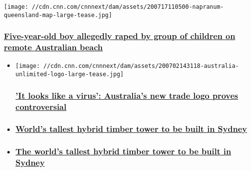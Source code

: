 \href{/2020/07/17/australia/australia-queensland-rape-boy-intl-hnk/index.html}{}

\texttt{[image: //cdn.cnn.com/cnnnext/dam/assets/200717110500-napranum-queensland-map-large-tease.jpg]}

\hypertarget{five-year-old-boy-allegedly-raped-by-group-of-children-on-remote-australian-beach}{%
\subsubsection{\texorpdfstring{\href{/2020/07/17/australia/australia-queensland-rape-boy-intl-hnk/index.html}{Five-year-old
boy allegedly raped by group of children on remote Australian
beach}}{Five-year-old boy allegedly raped by group of children on remote Australian beach}}\label{five-year-old-boy-allegedly-raped-by-group-of-children-on-remote-australian-beach}}

\begin{itemize}
\item
  \href{/style/article/australia-logo-design/index.html}{}

  \texttt{[image: //cdn.cnn.com/cnnnext/dam/assets/200702143118-australia-unlimited-logo-large-tease.jpg]}

  \hypertarget{it-looks-like-a-virus-australias-new-trade-logo-proves-controversial}{%
  \subsubsection{\texorpdfstring{\href{/style/article/australia-logo-design/index.html}{'It
  looks like a virus': Australia's new trade logo proves
  controversial}}{'It looks like a virus': Australia's new trade logo proves controversial}}\label{it-looks-like-a-virus-australias-new-trade-logo-proves-controversial}}
\item
  \hypertarget{worlds-tallest-hybrid-timber-tower-to-be-built-in-sydney}{%
  \subsubsection{\texorpdfstring{\href{/videos/architecture/2020/06/25/sydney-hybrid-timber-tower-lon-orig-tp.cnn}{World's
  tallest hybrid timber tower to be built in
  Sydney}}{World's tallest hybrid timber tower to be built in Sydney}}\label{worlds-tallest-hybrid-timber-tower-to-be-built-in-sydney}}
\item
  \hypertarget{the-worlds-tallest-hybrid-timber-tower-to-be-built-in-sydney}{%
  \subsubsection{\texorpdfstring{\href{/style/article/sydney-hybrid-timber-tower-scli-intl/index.html}{The
  world's tallest hybrid timber tower to be built in
  Sydney}}{The world's tallest hybrid timber tower to be built in Sydney}}\label{the-worlds-tallest-hybrid-timber-tower-to-be-built-in-sydney}}
\end{itemize}

